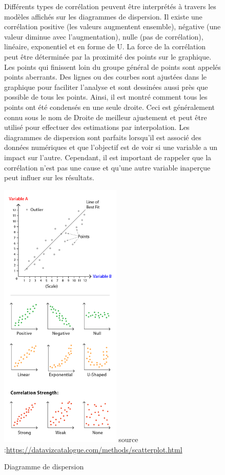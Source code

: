 \documentclass[french, a4paper, 12pt]{report}
\begin{document}
\begin{figure}[!htb]
\begin{minipage}{0.46\linewidth}
Différents types de corrélation peuvent être interprétés à travers les modèles affichés sur les diagrammes de dispersion. Il existe une corrélation positive (les valeurs augmentent ensemble), négative (une valeur diminue avec l’augmentation), nulle (pas de corrélation), linéaire, exponentiel et en forme de U. La force de la corrélation peut être déterminée par la proximité des points sur le graphique. Les points qui finissent loin du groupe général de points sont appelés points aberrants.
Des lignes ou des courbes sont ajustées dans le graphique pour faciliter l'analyse et sont dessinées aussi près que possible de tous les points. Ainsi, il est montré comment tous les points ont été condensés en une seule droite. Ceci est généralement connu sous le nom de Droite de meilleur ajustement et peut être utilisé pour effectuer des estimations par interpolation.
Les diagrammes de dispersion sont parfaits lorsqu’il est associé des données numériques et que l’objectif est de voir si une variable a un impact sur l'autre. Cependant, il est important de rappeler que la corrélation n'est pas une cause et qu'une autre variable inaperçue peut influer sur les résultats.
\end{minipage}\hfil
\begin{minipage}{0.35\linewidth}
    \includegraphics[height=13cm]{images/scatter-plot.png}
    \scriptsize{source :\url{https://datavizcatalogue.com/methods/scatterplot.html}}
    \caption{Diagramme de dispersion}
 \label{fig:1.6}
\end{minipage}
\end{figure}
\end{document}
